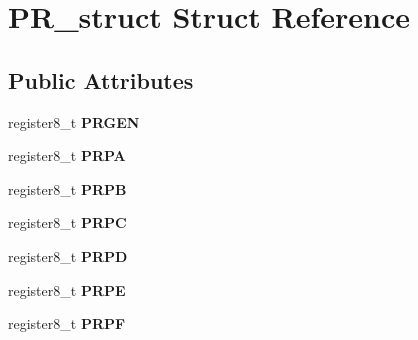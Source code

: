 \hypertarget{struct_p_r__struct}{}\section{P\+R\+\_\+struct Struct Reference}
\label{struct_p_r__struct}
\subsection*{Public Attributes}
\begin{DoxyCompactItemize}
\item 
register8\+\_\+t {\bfseries P\+R\+G\+EN}\hypertarget{struct_p_r__struct_ab94c5e750b8aa6fb1073a6fe3dcb4e8c}{}\label{struct_p_r__struct_ab94c5e750b8aa6fb1073a6fe3dcb4e8c}

\item 
register8\+\_\+t {\bfseries P\+R\+PA}\hypertarget{struct_p_r__struct_a085b84a3b5230193604c1b677ba8f5e3}{}\label{struct_p_r__struct_a085b84a3b5230193604c1b677ba8f5e3}

\item 
register8\+\_\+t {\bfseries P\+R\+PB}\hypertarget{struct_p_r__struct_a9e91484649b2a79c64d7eecd0e8878f3}{}\label{struct_p_r__struct_a9e91484649b2a79c64d7eecd0e8878f3}

\item 
register8\+\_\+t {\bfseries P\+R\+PC}\hypertarget{struct_p_r__struct_a795e9fe0b56aca1fa377bc83bb0b9e9c}{}\label{struct_p_r__struct_a795e9fe0b56aca1fa377bc83bb0b9e9c}

\item 
register8\+\_\+t {\bfseries P\+R\+PD}\hypertarget{struct_p_r__struct_a16393fdf8b1b9c7b92e6b65ac0b2689f}{}\label{struct_p_r__struct_a16393fdf8b1b9c7b92e6b65ac0b2689f}

\item 
register8\+\_\+t {\bfseries P\+R\+PE}\hypertarget{struct_p_r__struct_a7e9e5ab03b925dff588a2a9b03c008dd}{}\label{struct_p_r__struct_a7e9e5ab03b925dff588a2a9b03c008dd}

\item 
register8\+\_\+t {\bfseries P\+R\+PF}\hypertarget{struct_p_r__struct_a7c5a1e0e455d902eb9a093f37e63a12d}{}\label{struct_p_r__struct_a7c5a1e0e455d902eb9a093f37e63a12d}

\end{DoxyCompactItemize}



